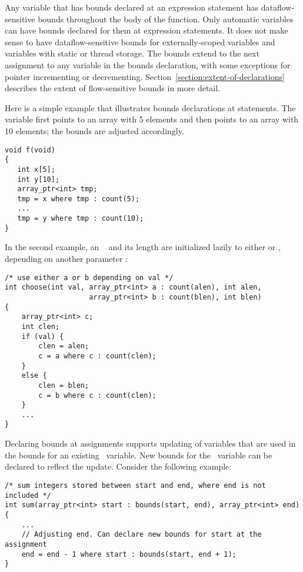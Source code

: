 Any variable that has bounds declared at an expression statement has
dataflow-sensitive bounds throughout the body of the function. Only
automatic variables can have bounds declared for them at expression
statements. It does not make sense to have dataflow-sensitive bounds for
externally-scoped variables and variables with static or thread storage.
The bounds extend to the next assignment to any variable in the bounds
declaration, with some exceptions for pointer incrementing or
decrementing. Section~\ref{section:extent-of-declarations}
describes the extent of flow-sensitive bounds
in more detail.

Here is a simple example that illustrates bounds declarations at
statements. The variable  first points to an array with 5
elements and then points to an array with 10 elements; the bounds are
adjusted accordingly.

\begin{lstlisting}
void f(void)
{
   int x[5];
   int y[10];
   array_ptr<int> tmp;
   tmp = x where tmp : count(5);
   ...
   tmp = y where tmp : count(10);
}
\end{lstlisting}

In the second example, an \arrayptr\  and its length are initialized
lazily to either  or , depending on another parameter :

\begin{lstlisting}
/* use either a or b depending on val */
int choose(int val, array_ptr<int> a : count(alen), int alen,
                    array_ptr<int> b : count(blen), int blen)
{
    array_ptr<int> c;
    int clen;
    if (val) {
        clen = alen;
        c = a where c : count(clen);
    }
    else {
        clen = blen;
        c = b where c : count(clen);
    }
    ...
}
\end{lstlisting}

Declaring bounds at assignments supports updating of variables that are
used in the bounds for an existing \arrayptr\ variable. New
bounds for the \arrayptr\ variable can be declared to reflect
the update. Consider the following example:

\begin{lstlisting}
/* sum integers stored between start and end, where end is not included */
int sum(array_ptr<int> start : bounds(start, end), array_ptr<int> end)
{
    ...
    // Adjusting end. Can declare new bounds for start at the assignment
    end = end - 1 where start : bounds(start, end + 1);
}
\end{lstlisting}


